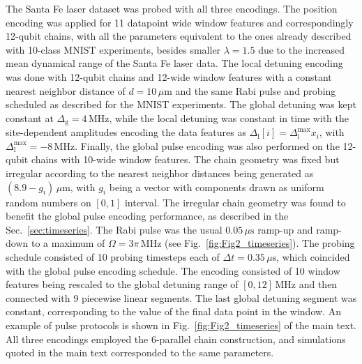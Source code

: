 \documentclass[english,floatfix,twocolumn,showpacs, aps, prx, reprint, superscriptaddress, longbibliography]{revtex4-2}
\begin{document}
The Santa Fe laser dataset was probed with all three encodings. The position encoding was applied for 11 datapoint wide window features and correspondingly 12-qubit chains, with all the parameters equivalent to the ones already described with 10-class MNIST experiments, besides smaller $\lambda=1.5$ due to the increased mean dynamical range of the Santa Fe laser data. The local detuning encoding was done with 12-qubit chains and 12-wide window features with a constant nearest neighbor distance of $d=10 \, \mu \mathrm{m}$ and the same Rabi pulse and probing scheduled as described for the MNIST experiments. The global detuning was kept constant at $\Delta_\mathrm{g}= 4 \, \mathrm{MHz}$, while the local detuning was constant in time with the site-dependent amplitudes encoding the data features as $\Delta_\mathrm{l}[i]=\Delta_{\mathrm{l}}^{\mathrm{max}}x_i$, with $\Delta_{\mathrm{l}}^{\mathrm{max}}=-8 \, \mathrm{MHz}$. Finally, the global pulse encoding was also performed on the 12-qubit chains with 10-wide window features. The chain geometry was fixed but irregular according to the nearest neighbor distances being generated as $(8.9-g_i)\, \mu \mathrm{m}$, with $g_i$ being a vector with components drawn as uniform random numbers on $[0, 1]$ interval. The irregular chain geometry was found to benefit the global pulse encoding performance, as described in the Sec.~\ref{sec:timeseries}. The Rabi pulse was the usual $0.05 \, \mu \mathrm{s}$ ramp-up and ramp-down to a maximum of $\Omega= 3\pi \, \mathrm{MHz}$ (see Fig.~\ref{fig:Fig2_timeseries}). The probing schedule consisted of 10 probing timesteps each of $\Delta t = 0.35 \, \mu \mathrm{s}$, which coincided with the global pulse encoding schedule. The encoding consisted of 10 window features being rescaled to the global detuning range of $[0, 12]\, \mathrm{MHz}$ and then connected with 9 piecewise linear segments. The last global detuning segment was constant, corresponding to the value of the final data point in the window. An example of pulse protocols is shown in Fig.~\ref{fig:Fig2_timeseries} of the main text. All three encodings employed the 6-parallel chain construction, and simulations quoted in the main text corresponded to the same parameters.
\end{document}
